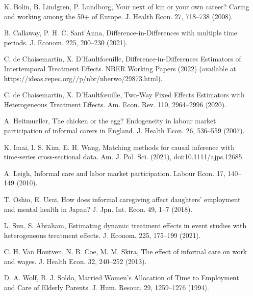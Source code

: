 \documentclass{beamer}
\begin{document}
\begin{thebibliography}{99}
    \beamertemplatetextbibitems
    \item K. Bolin, B. Lindgren, P. Lundborg, Your next of kin or your own career? Caring and working among the 50+ of Europe. J. Health Econ. 27, 718–738 (2008).

    \item B. Callaway, P. H. C. Sant’Anna, Difference-in-Differences with multiple time periods. J. Econom. 225, 200–230 (2021).
    
    \item C. de Chaisemartin, X. D’Haultfoeuille, Difference-in-Differences Estimators of Intertemporal Treatment Effects. NBER Working Papers (2022) (available at https://ideas.repec.org//p/nbr/nberwo/29873.html).
    
    \item C. de Chaisemartin, X. D’Haultfœuille, Two-Way Fixed Effects Estimators with Heterogeneous Treatment Effects. Am. Econ. Rev. 110, 2964–2996 (2020).
    
    \item A. Heitmueller, The chicken or the egg? Endogeneity in labour market participation of informal carers in England. J. Health Econ. 26, 536–559 (2007).
    
    \item K. Imai, I. S. Kim, E. H. Wang, Matching methods for causal inference with time‐series cross‐sectional data. Am. J. Pol. Sci. (2021), doi:10.1111/ajps.12685.
    
    \item A. Leigh, Informal care and labor market participation. Labour Econ. 17, 140–149 (2010).
    
    \item T. Oshio, E. Usui, How does informal caregiving affect daughters’ employment and mental health in Japan? J. Jpn. Int. Econ. 49, 1–7 (2018).
    
    \item L. Sun, S. Abraham, Estimating dynamic treatment effects in event studies with heterogeneous treatment effects. J. Econom. 225, 175–199 (2021).
    
    \item C. H. Van Houtven, N. B. Coe, M. M. Skira, The effect of informal care on work and wages. J. Health Econ. 32, 240–252 (2013).
    
    \item D. A. Wolf, B. J. Soldo, Married Women’s Allocation of Time to Employment and Care of Elderly Parents. J. Hum. Resour. 29, 1259–1276 (1994).
\end{thebibliography}
\end{document}
